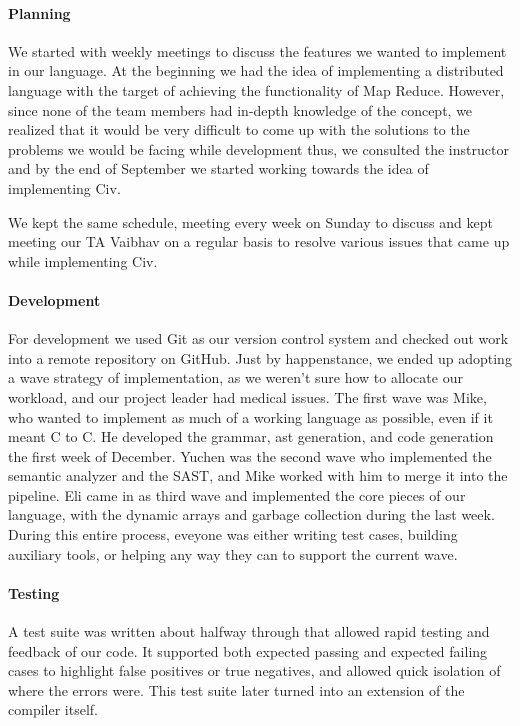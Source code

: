 \documentclass[a4paper]{article}
\begin{document}
\paragraph{Planning} We started with weekly meetings to discuss the features we wanted to implement in our language. At the beginning we had the idea of implementing a distributed language with the target of achieving the functionality of Map Reduce. However, since none of the team members had in-depth knowledge of the concept, we realized that it would be very difficult to come up with the solutions to the problems we would be facing while development thus, we consulted the instructor and by the end of September we started working towards the idea of implementing Civ.

We kept the same schedule, meeting every week on Sunday to discuss and kept meeting our TA Vaibhav on a regular basis to resolve various issues that came up while implementing Civ.


\paragraph{Development}
For development we used Git as our version control system and checked out work into a remote repository on GitHub. Just by happenstance, we ended up adopting a wave strategy of implementation, as we weren't sure how to allocate our workload, and our project leader had medical issues. The first wave was Mike, who wanted to implement as much of a working language as possible, even if it meant C to C. He developed the grammar, ast generation, and code generation the first week of December. Yuchen was the second wave who implemented the semantic analyzer and the SAST, and Mike worked with him to merge it into the pipeline. Eli came in as third wave and implemented the core pieces of our language, with the dynamic arrays and garbage collection during the last week. During this entire process, eveyone was either writing test cases, building auxiliary tools, or helping any way they can to support the current wave.

\paragraph{Testing}
A test suite was written about halfway through that allowed rapid testing and feedback of our code. It supported both expected passing and expected failing cases to highlight false positives or true negatives, and allowed quick isolation of where the errors were. This test suite later turned into an extension of the compiler itself.
\end{document}
